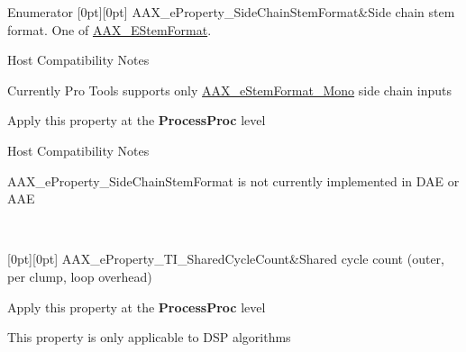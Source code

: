 \begin{DoxyEnumFields}{Enumerator}
[0pt][0pt]{}\mbox{\label{a00662_a13e384f22825afd3db6d68395b79ce0dae71ad10ce55fb8c4076fe70315b689ae}} 
A\+A\+X\+\_\+e\+Property\+\_\+\+Side\+Chain\+Stem\+Format&Side chain stem format. One of \mbox{\hyperlink{a00491_ad8af5ef008b2bd478add9a0acb0a1d85}{A\+A\+X\+\_\+\+E\+Stem\+Format}}. \begin{DoxyRefDesc}{Host Compatibility Notes}
\item[\mbox{\hyperlink{a00786__compatibility_notes000066}{Host Compatibility Notes}}]Currently Pro Tools supports only \mbox{\hyperlink{a00491_ad8af5ef008b2bd478add9a0acb0a1d85a0cc08ddb9923a4093c820efe84588947}{A\+A\+X\+\_\+e\+Stem\+Format\+\_\+\+Mono}} side chain inputs\end{DoxyRefDesc}


\begin{DoxyItemize}
\item Apply this property at the {\bfseries{Process\+Proc}} level\end{DoxyItemize}
\begin{DoxyRefDesc}{Host Compatibility Notes}
\item[\mbox{\hyperlink{a00786__compatibility_notes000067}{Host Compatibility Notes}}]A\+A\+X\+\_\+e\+Property\+\_\+\+Side\+Chain\+Stem\+Format is not currently implemented in D\+AE or A\+AE \end{DoxyRefDesc}
\\
\hline

[0pt][0pt]{}\mbox{\label{a00662_a13e384f22825afd3db6d68395b79ce0da3e5b289333ba49f5a33de40d89fa4ade}} 
A\+A\+X\+\_\+e\+Property\+\_\+\+T\+I\+\_\+\+Shared\+Cycle\+Count&Shared cycle count (outer, per clump, loop overhead) \begin{DoxyItemize}
\item Apply this property at the {\bfseries{Process\+Proc}} level \item This property is only applicable to D\+SP algorithms \end{DoxyItemize}
\\
\hline


\end{DoxyEnumFields}
